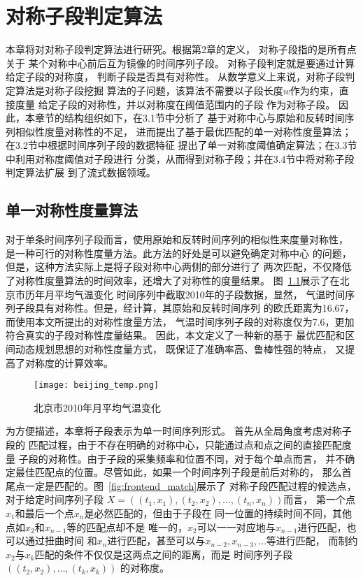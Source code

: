 
\chapter{对称子段判定算法}

本章将对对称子段判定算法进行研究。根据第2章的定义，
对称子段指的是所有点关于
某个对称中心前后互为镜像的时间序列子段。
对称子段判定就是要通过计算给定子段的对称度，
判断子段是否具有对称性。
从数学意义上来说，对称子段判定算法是对称子段挖掘
算法的子问题，该算法不需要以子段长度$w$作为约束，直接度量
给定子段的对称性，并以对称度在阈值范围内的子段
作为对称子段。
因此，本章节的结构组织如下，在3.1节中分析了
基于对称中心与原始和反转时间序列相似性度量对称性的不足，
进而提出了基于最优匹配的单一对称性度量算法；在3.2节中根据时间序列子段的数据特征
提出了单一对称度阈值确定算法；在3.3节中利用对称度阈值对子段进行
分类，从而得到对称子段；并在3.4节中将对称子段判定算法扩展
到了流式数据领域。

\section{单一对称性度量算法}

对于单条时间序列子段而言，使用原始和反转时间序列的相似性来度量对称性，
是一种可行的对称性度量方法。此方法的好处是可以避免确定对称中心
的问题，但是，这种方法实际上是将子段对称中心两侧的部分进行了
两次匹配，不仅降低了对称性度量算法的时间效率，还增大了对称性的度量结果。
图~\ref{fig:beijing_temp}展示了在北京市历年月平均气温变化
时间序列中截取2010年的子段数据，显然，
气温时间序列子段具有对称性。但是，经计算，其原始和反转时间序列
的欧氏距离为16.67，而使用本文所提出的对称性度量方法，
气温时间序列子段的对称度仅为7.6，更加符合真实的子段对称性度量结果。
因此，本文定义了一种新的基于
最优匹配和区间动态规划思想的对称性度量方式，
既保证了准确率高、鲁棒性强的特点，
又提高了对称度的计算效率。
\begin{figure}
  \centering
  \texttt{[image: beijing\_temp.png]}
  \caption{北京市2010年月平均气温变化}
  \label{fig:beijing_temp}
\end{figure}

为方便描述，本章将子段表示为单一时间序列形式。
首先从全局角度考虑对称子段的
匹配过程，由于不存在明确的对称中心，只能通过点和点之间的直接匹配度量
子段的对称性。由于子段的采集频率和位置不同，对于每个单点而言，
并不确定最佳匹配点的位置。尽管如此，如果一个时间序列子段是前后对称的，
那么首尾点一定是匹配的。图~\ref{fig:frontend_match}展示了
对称子段匹配过程的候选点，对于给定时间序列子段
$X=\left(\left(t_1,x_1 \right),\left(t_2,x_2\right),\dots,
  \left(t_n,x_n \right)\right)$而言，
第一个点$x_1$和最后一个点$x_n$是必然匹配的，但由于子段在
同一位置的持续时间不同，其他点如$x_2$和$x_{n-1}$等的匹配点却不是
唯一的，$x_2$可以一一对应地与$x_{n-1}$进行匹配，也可以通过扭曲时间
和$x_n$进行匹配，甚至可以与$x_{n-2},x_{n-3},\dots$等进行匹配，
而制约$x_2$与$x_k$匹配的条件不仅仅是这两点之间的距离，而是
时间序列子段$\left(\left(t_2,x_2 \right),\dots,\left(t_k,x_k \right)\right)$
的对称度。

